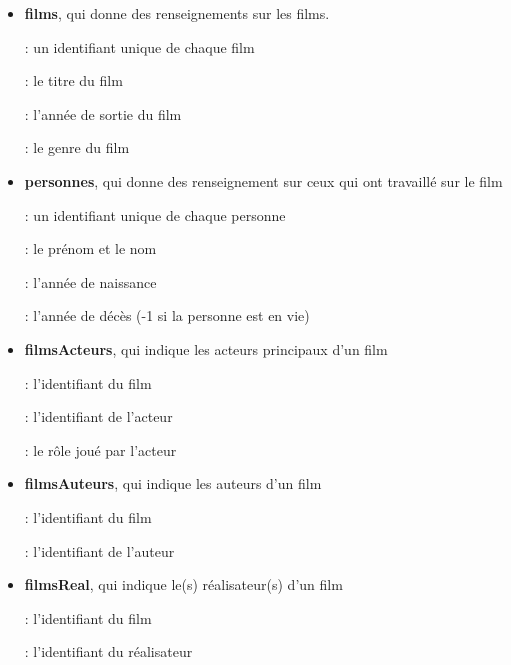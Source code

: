 \begin{itemize}
  \item {\bf films}, qui donne des renseignements sur les films.
  
     : un identifiant unique de chaque film
    
     : le titre du film
   
    : l'année de sortie du film
   
    : le genre du film
 
  \item {\bf personnes}, qui donne des renseignement sur ceux qui ont travaillé sur le film
  
   : un identifiant unique de chaque personne
  
   : le prénom et le nom
  
   : l'année de naissance
  
   : l'année de décès (-1 si la personne est en vie)

  \item {\bf filmsActeurs}, qui indique les acteurs principaux d'un film

    : l'identifiant du film
   
    : l'identifiant de l'acteur
   
    : le rôle joué par l'acteur

\item {\bf filmsAuteurs}, qui indique les auteurs d'un film

   : l'identifiant du film
  
   : l'identifiant de l'auteur

  \item {\bf filmsReal}, qui indique le(s) réalisateur(s) d'un film

   : l'identifiant du film
  
   : l'identifiant du réalisateur
\end{itemize}

